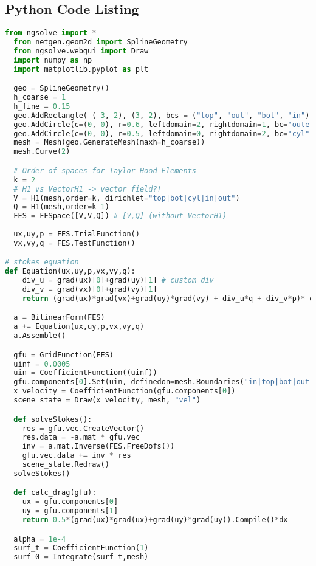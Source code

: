 \begin{appendix}
\addappheadtotoc
\section{Python Code Listing}
\label{app_a}


\begin{lstlisting}[language=Python, title=NGSolve Shape Optimization Code in Python, label=final_code]
  from ngsolve import *
  from netgen.geom2d import SplineGeometry
  from ngsolve.webgui import Draw
  import numpy as np
  import matplotlib.pyplot as plt

  geo = SplineGeometry()
  h_coarse = 1
  h_fine = 0.15
  geo.AddRectangle( (-3,-2), (3, 2), bcs = ("top", "out", "bot", "in"), leftdomain=1, rightdomain=0, maxh=h_coarse) 
  geo.AddCircle(c=(0, 0), r=0.6, leftdomain=2, rightdomain=1, bc="outer_cylinder", maxh=h_fine) 
  geo.AddCircle(c=(0, 0), r=0.5, leftdomain=0, rightdomain=2, bc="cyl", maxh=h_fine) 
  mesh = Mesh(geo.GenerateMesh(maxh=h_coarse))
  mesh.Curve(2)

  # Order of spaces for Taylor-Hood Elements
  k = 2
  # H1 vs VectorH1 -> vector field?!
  V = H1(mesh,order=k, dirichlet="top|bot|cyl|in|out")
  Q = H1(mesh,order=k-1)
  FES = FESpace([V,V,Q]) # [V,Q] (without VectorH1)
  
  ux,uy,p = FES.TrialFunction()
  vx,vy,q = FES.TestFunction()

# stokes equation
def Equation(ux,uy,p,vx,vy,q):
    div_u = grad(ux)[0]+grad(uy)[1] # custom div
    div_v = grad(vx)[0]+grad(vy)[1]
    return (grad(ux)*grad(vx)+grad(uy)*grad(vy) + div_u*q + div_v*p)* dx

  a = BilinearForm(FES)
  a += Equation(ux,uy,p,vx,vy,q)
  a.Assemble()

  gfu = GridFunction(FES)
  uinf = 0.0005
  uin = CoefficientFunction((uinf))
  gfu.components[0].Set(uin, definedon=mesh.Boundaries("in|top|bot|out"))
  x_velocity = CoefficientFunction(gfu.components[0])
  scene_state = Draw(x_velocity, mesh, "vel")

  def solveStokes():
    res = gfu.vec.CreateVector()
    res.data = -a.mat * gfu.vec
    inv = a.mat.Inverse(FES.FreeDofs())
    gfu.vec.data += inv * res
    scene_state.Redraw()
  solveStokes()

  def calc_drag(gfu):
    ux = gfu.components[0]
    uy = gfu.components[1]
    return 0.5*(grad(ux)*grad(ux)+grad(uy)*grad(uy)).Compile()*dx

  alpha = 1e-4
  surf_t = CoefficientFunction(1)
  surf_0 = Integrate(surf_t,mesh)
    

\end{lstlisting}
\end{appendix}
